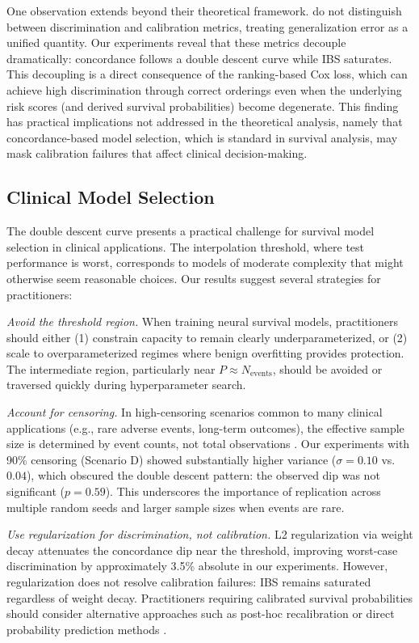 \documentclass[12pt,a4paper]{article}
\begin{document}
One observation extends beyond their theoretical framework. \citet{liu2025understanding} do not distinguish between discrimination and calibration metrics, treating generalization error as a unified quantity. Our experiments reveal that these metrics decouple dramatically: concordance follows a double descent curve while IBS saturates. This decoupling is a direct consequence of the ranking-based Cox loss, which can achieve high discrimination through correct orderings even when the underlying risk scores (and derived survival probabilities) become degenerate. This finding has practical implications not addressed in the theoretical analysis, namely that concordance-based model selection, which is standard in survival analysis, may mask calibration failures that affect clinical decision-making.

\subsection{Clinical Model Selection}

The double descent curve presents a practical challenge for survival model selection in clinical applications. The interpolation threshold, where test performance is worst, corresponds to models of moderate complexity that might otherwise seem reasonable choices. Our results suggest several strategies for practitioners:

\textit{Avoid the threshold region.} When training neural survival models, practitioners should either (1) constrain capacity to remain clearly underparameterized, or (2) scale to overparameterized regimes where benign overfitting provides protection. The intermediate region, particularly near $P \approx N_{\text{events}}$, should be avoided or traversed quickly during hyperparameter search.

\textit{Account for censoring.} In high-censoring scenarios common to many clinical applications (e.g., rare adverse events, long-term outcomes), the effective sample size is determined by event counts, not total observations \citep{therneau2000modeling}. Our experiments with 90\% censoring (Scenario D) showed substantially higher variance ($\sigma = 0.10$ vs.\ $0.04$), which obscured the double descent pattern: the observed dip was not significant ($p = 0.59$). This underscores the importance of replication across multiple random seeds and larger sample sizes when events are rare.

\textit{Use regularization for discrimination, not calibration.} L2 regularization via weight decay attenuates the concordance dip near the threshold, improving worst-case discrimination by approximately 3.5\% absolute in our experiments. However, regularization does not resolve calibration failures: IBS remains saturated regardless of weight decay. Practitioners requiring calibrated survival probabilities should consider alternative approaches such as post-hoc recalibration \citep{crowson2016assessing, vancalster2019calibration} or direct probability prediction methods \citep[e.g.,][]{lee2018deephit}.
\end{document}

